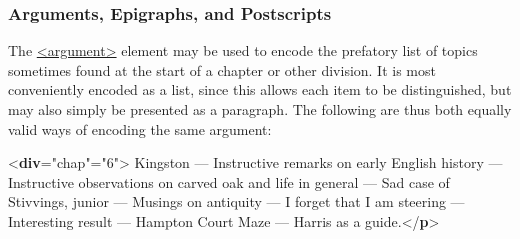 \subsubsection[{Arguments, Epigraphs, and Postscripts}]{Arguments, Epigraphs, and Postscripts}\label{DSAE}\par
The \hyperref[TEI.argument]{<argument>} element may be used to encode the prefatory list of topics sometimes found at the start of a chapter or other division. It is most conveniently encoded as a list, since this allows each item to be distinguished, but may also simply be presented as a paragraph. The following are thus both equally valid ways of encoding the same argument: \par\bgroup{}\exampleFont \begin{shaded}\noindent\mbox{}{<\textbf{div}\hspace*{1em}{type}="{chap}"\hspace*{1em}{n}="{6}">}\mbox{}\newline 
{}\mbox{}\newline 
\hspace*{1em}Kingston — Instructive remarks on early English history\mbox{}\newline 
\hspace*{1em}\hspace*{1em}\hspace*{1em}\hspace*{1em} — Instructive observations on carved oak and life in general\mbox{}\newline 
\hspace*{1em}\hspace*{1em}\hspace*{1em}\hspace*{1em} — Sad case of Stivvings, junior — Musings on antiquity\mbox{}\newline 
\hspace*{1em}\hspace*{1em}\hspace*{1em}\hspace*{1em} — I forget that I am steering — Interesting result\mbox{}\newline 
\hspace*{1em}\hspace*{1em}\hspace*{1em}\hspace*{1em} — Hampton Court Maze — Harris as a guide.{</\textbf{p}>}\mbox{}\newline 

\end{shaded}
